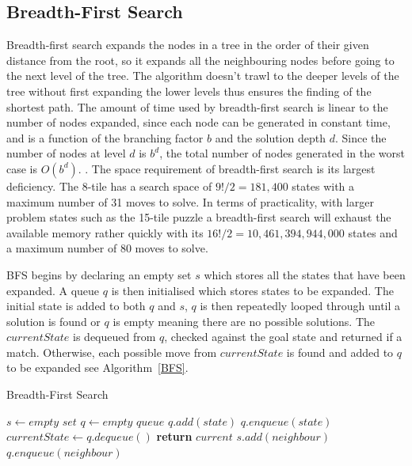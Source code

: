 \documentclass[final]{cmpreport}
\begin{document}
\subsection{Breadth-First Search}
Breadth-first search expands the nodes in a tree in the order of their given distance from the root, so it expands all the neighbouring nodes before going to the next level of the tree. The algorithm doesn't trawl to the deeper levels of the tree without first expanding the lower levels thus ensures the finding of the shortest path. The amount of time used by breadth-first search is linear to the number of nodes expanded, since each node can be generated in constant time, and is a function of the branching factor $b$ and the solution depth $d$. Since the number of nodes at level $d$ is $b^d$, the total number of nodes generated in the worst case is $O(b^d)$. \citep{DBLP:journals/mima/Korf95}. The space requirement of breadth-first search is its largest deficiency. The 8-tile has a search space of $9!/2=181,400$ states with a maximum number of 31 moves to solve. In terms of practicality, with larger problem states such as the 15-tile puzzle a breadth-first search will exhaust the available memory rather quickly with its $16!/2 = 10,461,394,944,000$ states and a maximum number of 80 moves to solve.

BFS begins by declaring an empty set $s$ which stores all the states that have been expanded. A queue $q$ is then initialised which stores states to be expanded. The initial state is added to both $q$ and $s$, $q$ is then repeatedly looped through until a solution is found or $q$ is empty meaning there are no possible solutions. The $currentState$ is dequeued from $q$, checked against the goal state and returned if a match. Otherwise, each possible move from $currentState$ is found and added to $q$ to be expanded see Algorithm~\ref{BFS}.
	\begin{algorithm}
	\caption{Breadth-First Search}\label{BFS}
	\begin{algorithmic}[1]
		\State $s \gets \textit{empty set}$
		\State $q \gets \textit{empty queue}$
		\State $q.add(state)$
		\State $q.enqueue(state)$
		\State $currentState \gets q.dequeue()$
		\State \textbf{return} $current$
		\EndIf
		\State $s.add(neighbour)$
		\State $q.enqueue(neighbour)$
		\EndIf
		
		\EndFor
		\EndWhile
		\EndProcedure
	\end{algorithmic}
\end{algorithm}
\end{document}
